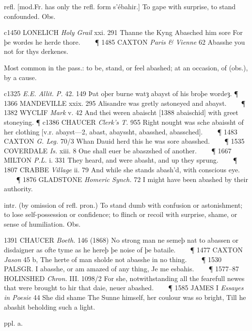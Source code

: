 \begin{description}[wide, labelwidth=!, labelindent=0pt]
\begin{myenumerate}
 refl. [mod.Fr. has only the refl. form s'ébahir.] To gape with surprise,
to stand confounded. Obs. 

c1450 LONELICH \textit{Holy Grail} xxi. 291 Thanne the Kyng Abasched him sore For þe
wordes he herde thore.    
\P
1485 CAXTON \textit{Paris \& Vienne} 62 Abasshe you not for thys derkenes.

Most common in the pass.: to be, stand, or feel abashed; at an occasion,
of (obs.), by a cause. 

c1325 \textit{E.E. Allit. P.} 42. 149 Þat oþer burne watȝ abayst of his broþe wordeȝ.
\P
1366 MANDEVILLE xxix. 295 Alisandre was gretly astoneyed and abayst.    
\P
1382 WYCLIF \textit{Mark} v. 42 And thei weren abaischt [1388 abaischid] with greet stoneying.
\P
c1386 CHAUCER \textit{Clerk's T.} 955 Right nought was sche abaissht of her clothing
[v.r. abayst—2, abast, abayssht, abasshed, abassched].    
\P
1483 CAXTON \textit{G. Leg.} 70/3 Whan Dauid herd this he was sore abasshed.    
\P
1535 COVERDALE \textit{Is.} xiii. 8 One shall euer be abaszshed of another.    
\P
1667 MILTON \textit{P.L.} i. 331 They heard, and were abasht, and up they sprung.    
\P
1807 CRABBE \textit{Village} ii. 79 And while she stands abash'd, with conscious eye.    
\P
1876 GLADSTONE \textit{Homeric Synch.} 72 I might have been abashed by their authority.

 intr. (by omission of refl. pron.) To stand dumb with confusion or
astonishment; to lose self-possession or confidence; to flinch or recoil with
surprise, shame, or sense of humiliation. Obs. 

1391 CHAUCER \textit{Boeth.} 146 (1868) No strong man ne semeþ nat to abassen or
disdaigner as ofte tyme as he hereþ þe noise of þe bataile.    
\P
1477 CAXTON \textit{Jason} 45 b, The herte of man sholde not abasshe in no thing.    
\P
1530 PALSGR. I abasshe, or am amazed of any thing, Je me esbahis.    
\P
1577–87 HOLINSHED \textit{Chron.} III. 1098/2 For she, notwithstanding all the 
fearefull newes that were brought to hir that daie, neuer abashed.    
\P
1585 JAMES I \textit{Essayes in Poesie} 44 She did shame The Sunne himself, her 
coulour was so bright, Till he abashit beholding such a light.
\end{myenumerate}

 ppl. a.  

\noindent {}

\noindent [abash v. + -ed.] 


\end{description}
